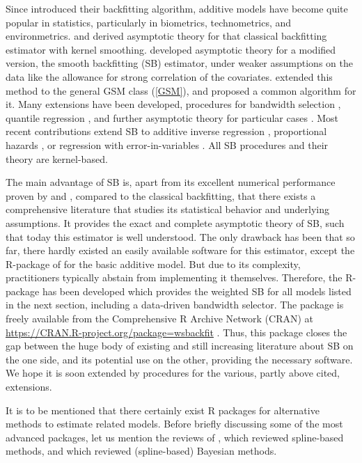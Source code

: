 Since \cite{HT1990} introduced their backfitting algorithm, additive models have become quite popular in statistics, particularly in biometrics, technometrics, and environmetrics. \cite{OR1997} and \cite{O2000} derived asymptotic theory for that classical backfitting estimator with kernel smoothing. \cite{MLN1999} developed asymptotic theory for a modified version, the smooth backfitting (SB) estimator, under weaker assumptions on the data like the allowance for strong correlation of the covariates. \cite{MN2003} extended this method to the general GSM class (\ref{GSM}), and \cite{RS2010} proposed a common algorithm for it. Many extensions have been developed, procedures for bandwidth selection \cite[e.g.,][]{MP2005}, quantile regression \citep{LMP2010}, and further asymptotic theory for particular cases \cite[see e.g.,][for GAM]{YPM2008}. Most recent contributions extend SB to additive inverse regression \citep{BDHB2016}, proportional hazards \citep{HMMMN2017}, or regression with error-in-variables \citep{HP2018}. All SB procedures and their theory are kernel-based. 

The main advantage of SB is, apart from its excellent numerical performance proven by \citet{NS2005} and \cite{RS2010}, compared to the classical backfitting, that there exists a comprehensive literature that studies its statistical behavior and underlying assumptions. It provides the exact and complete asymptotic theory of SB, such that today this estimator is well understood. The only drawback has been that so far, there  hardly existed an easily available software for this estimator, except the R-package  of \cite{RPsBF} for the basic additive model. But due to its complexity, practitioners typically abstain from implementing it themselves. Therefore, the  R-package has been developed which provides the weighted SB for all models listed in the next section, including a data-driven bandwidth selector. The package is freely available from the Comprehensive R Archive Network (CRAN) at \url{ https://CRAN.R-project.org/package=wsbackfit} \citep{R20}. Thus, this package closes the gap between the huge
body of existing and still increasing literature about SB on the one side, and its potential use on the other, providing the necessary software.   
We  hope it is soon extended by procedures for the various, partly above cited, extensions. 


It is to be mentioned that there certainly exist R packages for alternative methods to estimate related models. Before briefly discussing some of the most advanced packages, let us mention the reviews of \cite{BT2008}, which reviewed spline-based methods, and \cite{FKL2004} which reviewed (spline-based) Bayesian methods. 

